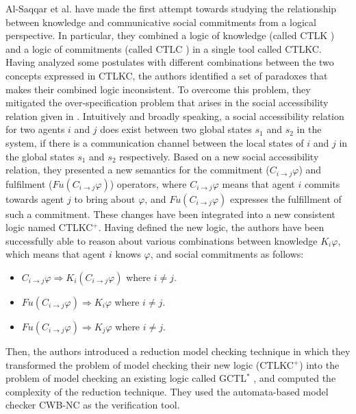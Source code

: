 Al-Saqqar et al. \cite{Al-Saqqar2014a} have made the first attempt
towards studying the relationship between knowledge and
communicative social commitments from a logical perspective. In
particular, they combined a logic of knowledge (called CTLK
\cite{Lomuscio2007}) and a logic of commitments (called CTLC
\cite{Bentahar2012}) in a single tool called CTLKC. Having
analyzed some postulates with different combinations between the
two concepts expressed in CTLKC, the authors identified a set of
paradoxes that makes their combined logic inconsistent. To
overcome this problem, they mitigated the over-specification
problem that arises in the social accessibility relation given in
\cite{Bentahar2012,El-Menshawy2013a}. Intuitively and broadly
speaking, a social accessibility relation for two agents $i$ and
$j$ does exist between two global states $s_1$ and $s_2$ in the
system, if there is a communication channel between the local
states of $i$ and $j$ in the global states $s_1$ and $s_2$
respectively. Based on a new social accessibility relation, they
presented a new semantics for the commitment ($C_{i\rightarrow j}
\varphi$) and fulfilment ($Fu (C _{i\rightarrow j} \varphi)$)
operators, where $C_{i\rightarrow j} \varphi$ means that agent $i$
commits towards agent $j$ to bring about $\varphi$, and $Fu (C
_{i\rightarrow j} \varphi)$ expresses the fulfillment of such a
commitment. These changes have been integrated into a new
consistent logic named CTLKC$^+$. Having defined the new logic,
the authors have been successfully able to reason about various
combinations between knowledge $K_i \varphi$, which means that
agent $i$ knows $\varphi$, and social commitments as follows:

\begin{itemize}
\item $C_{i\rightarrow j} \varphi \Rightarrow K_i (C_{i\rightarrow
j} \varphi) $ where $i \neq j$.
\item $Fu (C _{i\rightarrow j} \varphi) \Rightarrow K _i \varphi$ where $i \neq j$.
\item $Fu (C _{i\rightarrow j} \varphi) \Rightarrow K_j \varphi$ where $i \neq j$.

\end{itemize}

Then, the authors introduced a reduction model checking technique
in which they transformed the problem of model checking their new
logic (CTLKC$^+$) into the problem of model checking an existing
logic called GCTL$^*$ \cite{Bhat2001}, and computed the complexity of the reduction technique. They used the automata-based model checker CWB-NC as the verification tool.


